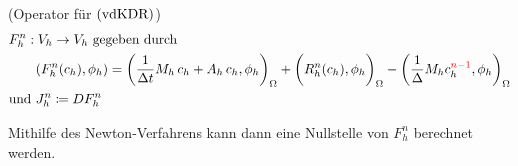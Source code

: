 \begin{define}(Operator für $ \operatorname{(vdKDR)} $)
	\begin{align*}
		&F_h^n: V_h \to V_h \text{ gegeben durch }\\ & \qquad (F_h^n(c_h), \phi_h) = \bigg( \frac{1}{\Delta t} M_h \, c_h + A_h \, c_h, \phi_h  \bigg)_\Omega + \bigg( R_h^n(c_h), \phi_h \bigg)_\Omega - \bigg( \frac{1}{\Delta} M_h c_h^{\textcolor{red}{n-1}}, \phi_h \bigg)_\Omega \\
		&\text{und } J_h^n \coloneqq D F_h^n
	\end{align*} 
\end{define}
Mithilfe des Newton-Verfahrens kann dann eine Nullstelle von $F_h^n$ berechnet werden.

%	
%	


